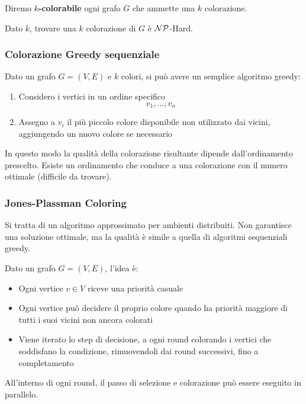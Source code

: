 Diremo \textbf{$k$-colorabile} ogni grafo $G$ che ammette una $k$ colorazione.

Dato $k$, trovare una $k$ colorazione di $G$ è $\mathcal{NP}$-Hard.

\subsubsection{Colorazione Greedy sequenziale}

Dato un grafo $G = (V,E)$ e $k$ colori, si può avere un semplice algoritmo greedy:
\begin{enumerate}
    \item Considero i vertici in un ordine specifico
    $$ v_1, \dots, v_n $$
    
    \item Assegno a $v_i$ il più piccolo colore disponibile non utilizzato dai vicini, aggiungendo un nuovo colore se necessario
\end{enumerate}

In questo modo la qualità della colorazione risultante dipende dall'ordinamento prescelto. Esiste un ordinamento che conduce a una colorazione con il numero ottimale (difficile da trovare).

\subsubsection{Jones-Plassman Coloring}

Si tratta di un algoritmo approssimato per ambienti distribuiti. Non garantisce una soluzione ottimale, ma la qualità è simile a quella di algoritmi sequenziali greedy.

Dato un grafo $G = (V,E)$, l'idea è:
\begin{itemize}
    \item Ogni vertice $v \in V$ riceve una priorità casuale
    
    \item Ogni vertice può decidere il proprio colore quando ha priorità maggiore di tutti i suoi vicini non ancora colorati
    
    \item Viene iterato lo step di decisione, a ogni round colorando i vertici che soddisfano la condizione, rimuovendoli dai round successivi, fino a completamento 
\end{itemize}

All'interno di ogni round, il passo di selezione e colorazione può essere eseguito in parallelo. 

